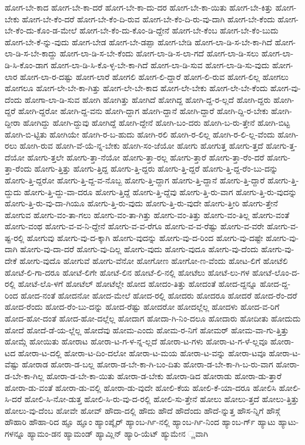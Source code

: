 {ಹೋಗ-ಬೇ-ಕಾದ
ಹೋಗ-ಬೇ-ಕಾ-ದರೆ
ಹೋಗ-ಬೇ-ಕಾ-ದು-ದರ
ಹೋಗ-ಬೇ-ಕಾ-ಯಿತು
ಹೋಗ-ಬೇ-ಕಿತ್ತು
ಹೋಗ-ಬೇಕು
ಹೋಗ-ಬೇ-ಕೆಂ-ದರೆ
ಹೋಗ-ಬೇ-ಕೆಂ-ದಿ-ರುವ
ಹೋಗ-ಬೇ-ಕೆಂ-ದಿ-ರು-ವು-ದಾಗಿ
ಹೋಗ-ಬೇ-ಕೆಂದು
ಹೋಗ-ಬೇ-ಕೆಂ-ದು-ಕೊಂ-ಡ-ಮೇಲೆ
ಹೋಗ-ಬೇ-ಕೆಂ-ದು-ಕೊಂ-ಡಿ-ದ್ದೇನೆ
ಹೋಗ-ಬೇ-ಕೆಂಬ
ಹೋಗ-ಬೇ-ಕೆಂ-ಬುದು
ಹೋಗ-ಬೇ-ಕೆ-ನ್ನು-ವುದು
ಹೋಗ-ಬೇಡ
ಹೋಗ-ಬೇ-ಡಪ್ಪಾ
ಹೋಗ-ಬೇಡಿ
ಹೋಗ-ಲಾ-ಡಿ-ಸ-ಬೇ-ಕಾ-ಗಿದೆ
ಹೋಗ-ಲಾ-ಡಿ-ಸ-ಬೇ-ಕಾದ್ದು
ಹೋಗ-ಲಾ-ಡಿ-ಸ-ಬೇ-ಕೆಂದು
ಹೋಗ-ಲಾ-ಡಿ-ಸ-ಲಾ-ಗದೆ
ಹೋಗ-ಲಾ-ಡಿ-ಸಲು
ಹೋಗ-ಲಾ-ಡಿ-ಸಿ-ಕೊಂ-ಡಾಗ
ಹೋಗ-ಲಾ-ಡಿ-ಸಿ-ಕೊ-ಳ್ಳ-ಬೇ-ಕಾ-ಗಿದೆ
ಹೋಗ-ಲಾ-ಡಿ-ಸುವ
ಹೋಗ-ಲಾ-ಡಿ-ಸು-ವುದು
ಹೋಗ-ಲಾರ
ಹೋಗ-ಲಾ-ರ-ದಷ್ಟು
ಹೋಗ-ಲಾರೆ
ಹೋಗಲಿ
ಹೋಗ-ಲಿ-ದ್ದಾರೆ
ಹೋಗ-ಲಿ-ರುವ
ಹೋಗ-ಲಿಲ್ಲ
ಹೋಗಲು
ಹೋಗಲೂ
ಹೋಗ-ಲೇ-ಬೇ-ಕಾ-ಗಿತ್ತು
ಹೋಗ-ಲೇ-ಬೇ-ಕಾದ
ಹೋಗ-ಲೇ-ಬೇಕು
ಹೋಗ-ಲೇ-ಬೇ-ಕೆಂದು
ಹೋಗ-ವು-ದೆಂದು
ಹೋಗಾ-ಲಾ-ಡಿ-ಸುವ
ಹೋಗಿ
ಹೋಗಿತ್ತು
ಹೋಗಿದೆ
ಹೋಗಿದ್ದ
ಹೋಗಿ-ದ್ದ-ರ-ಲ್ಲದೆ
ಹೋಗಿ-ದ್ದರು
ಹೋಗಿ-ದ್ದರೆ
ಹೋಗಿ-ದ್ದರೋ
ಹೋಗಿ-ದ್ದ-ವನು
ಹೋಗಿ-ದ್ದಾಗ
ಹೋಗಿ-ದ್ದಾನೆ
ಹೋಗಿ-ದ್ದಾರೆ
ಹೋಗಿ-ದ್ದಿ-ರ-ಬೇಕು
ಹೋಗಿ-ದ್ದೀರಾ
ಹೋಗಿದ್ದು
ಹೋಗಿ-ದ್ದುವು
ಹೋಗಿದ್ದೆ
ಹೋಗಿ-ದ್ದೇನೆ
ಹೋಗಿ-ಬಂ-ದರು
ಹೋಗಿ-ಬ-ರು-ತ್ತೇನೆ
ಹೋಗಿ-ಬಿಟ್ಟ
ಹೋಗಿ-ಬಿ-ಟ್ಟಿತು
ಹೋಗಿಯೇ
ಹೋಗಿ-ರ-ಬ-ಹುದು
ಹೋಗಿ-ರಲಿ
ಹೋಗಿ-ರ-ಲಿಲ್ಲ
ಹೋಗಿ-ರ-ಲಿ-ಲ್ಲ-ವೆಂದು
ಹೋಗಿ-ರಲು
ಹೋಗಿ-ರುವ
ಹೋಗಿ-ವೆ-ಯೆ-ನ್ನ-ಬೇಕು
ಹೋಗಿ-ಸಂ-ಜೆಯೋ
ಹೋಗು
ಹೋಗುತ್ತ
ಹೋಗು-ತ್ತದೆ
ಹೋಗು-ತ್ತ-ದೆಯೋ
ಹೋಗು-ತ್ತಲೇ
ಹೋಗು-ತ್ತಾ-ನೆಯೋ
ಹೋಗು-ತ್ತಾ-ರಲ್ಲ
ಹೋಗು-ತ್ತಾರೆ
ಹೋಗು-ತ್ತಾ-ರೆಂ-ದರೆ
ಹೋಗು-ತ್ತಾ-ರೆಂದು
ಹೋಗು-ತ್ತಿತ್ತು
ಹೋಗು-ತ್ತಿದ್ದ
ಹೋಗು-ತ್ತಿ-ದ್ದರು
ಹೋಗು-ತ್ತಿ-ದ್ದರೆ
ಹೋಗು-ತ್ತಿ-ದ್ದ-ರೆಂ-ಬು-ದನ್ನು
ಹೋಗು-ತ್ತಿ-ದ್ದರೋ
ಹೋಗು-ತ್ತಿ-ದ್ದ-ವ-ನೊಬ್ಬ
ಹೋಗು-ತ್ತಿ-ದ್ದಾಗ
ಹೋಗು-ತ್ತಿ-ದ್ದಾನೆ
ಹೋಗು-ತ್ತಿ-ದ್ದಾರೆ
ಹೋಗು-ತ್ತಿ-ದ್ದುದು
ಹೋಗು-ತ್ತಿ-ದ್ದು-ವಾ-ದರೂ
ಹೋಗು-ತ್ತಿದ್ದೆ
ಹೋಗು-ತ್ತಿ-ದ್ದೆವು
ಹೋಗು-ತ್ತಿ-ರು-ವಾಗ
ಹೋಗು-ತ್ತಿ-ರು-ವುದನ್ನು
ಹೋಗು-ತ್ತಿ-ರು-ವು-ದಾ-ಗಿಯೂ
ಹೋಗು-ತ್ತಿ-ರು-ವುದು
ಹೋಗು-ತ್ತಿ-ರು-ವುದೇ
ಹೋಗು-ತ್ತೀರಿ
ಹೋಗು-ತ್ತೇನೆ
ಹೋಗುವ
ಹೋಗು-ವಂ-ತಾ-ಗಲು
ಹೋಗು-ವಂ-ತಾ-ಗಿತ್ತು
ಹೋಗು-ವಂ-ತಿತ್ತು
ಹೋಗು-ವಂ-ತಿಲ್ಲ
ಹೋಗು-ವಂತೆ
ಹೋಗು-ವಂಥ
ಹೋಗು-ವ-ವ-ನಿ-ದ್ದೇನೆ
ಹೋಗು-ವ-ವ-ರೆಗೂ
ಹೋಗು-ವ-ವ-ರೆಷ್ಟು
ಹೋಗು-ವ-ವರೇ
ಹೋಗು-ವ-ಷ್ಟ-ರಲ್ಲಿ
ಹೋಗುವು
ಹೋಗು-ವು-ದ-ಕ್ಕಾಗಿ
ಹೋಗು-ವುದನ್ನು
ಹೋಗು-ವು-ದ-ರಿಂದ
ಹೋಗು-ವು-ದಷ್ಟೇ
ಹೋಗು-ವು-ದಾಗಿ
ಹೋಗು-ವು-ದಾ-ದರೆ
ಹೋಗು-ವು-ದಿಲ್ಲ
ಹೋಗು-ವುದು
ಹೋಗು-ವುದೂ
ಹೋಗು-ವು-ದೆಂದು
ಹೋಗು-ವು-ದೇಕೆ
ಹೋಗು-ವುದೊ
ಹೋಗುವೆ
ಹೋಗು-ವೆನೋ
ಹೋಗೋಣ
ಹೋಗೋ-ಣ-ವೆಂದು
ಹೋಟ-ಲಿಗೆ
ಹೋಟೆಲಿ
ಹೋಟೆ-ಲಿ-ಗಾ-ದರೂ
ಹೋಟೆ-ಲಿಗೇ
ಹೋಟೆ-ಲಿನ
ಹೋಟೆ-ಲಿ-ನಲ್ಲಿ
ಹೋಟೆಲು
ಹೋಟೆ-ಲು-ಗಳ
ಹೋಟೆ-ಲೊಂ-ದ-ರಲ್ಲಿ
ಹೋಟೆ-ಲೊ-ಳಗೆ
ಹೋಟೆಲ್
ಹೋಟೆಲ್ಲೇ
ಹೋದ
ಹೋದಂ-ತಿತ್ತು
ಹೋದಂತೆ
ಹೋದ-ದ್ದನ್ನೂ
ಹೋದ-ದ್ದ-ರಿಂದ
ಹೋದ-ನಂತೆ
ಹೋದನೋ
ಹೋದ-ಮೇಲೆ
ಹೋದ-ರಲ್ಲಿ
ಹೋದರು
ಹೋದರೂ
ಹೋದರೆ
ಹೋದ-ರೆಂ-ದರೆ
ಹೋದ-ರೆಂದು
ಹೋದ-ರೆಂ-ಬು-ದನ್ನು
ಹೋದ-ರೆಷ್ಟು
ಹೋದರೋ
ಹೋದಲ್ಲೆಲ್ಲ
ಹೋದಳು
ಹೋದ-ವ-ರಿಗೆ
ಹೋದ-ಹೋ-ದಂತೆ
ಹೋದ-ಹೋ-ದಲ್ಲೆಲ್ಲ
ಹೋದಾಗ
ಹೋದಾ-ಗಿ-ನಿಂ-ದಲೂ
ಹೋದಾರು
ಹೋದೀತು
ಹೋದುದು
ಹೋದೆ
ಹೋದೆ-ಡೆ-ಯ-ಲ್ಲೆಲ್ಲ
ಹೋದೆವು
ಹೋಮ-ಎಂದು
ಹೋಮ-ರ-ನಿಗೆ
ಹೋಮರ್
ಹೋಮ-ವಾ-ಗು-ತ್ತಿತ್ತು
ಹೋಮ್ಗೆ
ಹೋಯಿತು
ಹೋರಾಟ
ಹೋರಾ-ಟ-ಗ-ಳ-ನ್ನ-ಲ್ಲದೆ
ಹೋರಾ-ಟ-ಗಳು
ಹೋರಾ-ಟ-ಗ-ಳೆ-ಲ್ಲವೂ
ಹೋರಾ-ಟದ
ಹೋರಾ-ಟ-ದಲ್ಲಿ
ಹೋರಾ-ಟ-ದಿಂ-ದಲೋ
ಹೋರಾ-ಟ-ಮಯ
ಹೋರಾ-ಟ-ವನ್ನು
ಹೋರಾ-ಟವೂ
ಹೋರಾ-ಟ-ವೆಷ್ಟು
ಹೋರಾಡ
ಹೋರಾ-ಡ-ಬಲ್ಲ
ಹೋರಾ-ಡ-ಬೇ-ಕಾ-ಗಿ-ಬಂ-ದಿತು
ಹೋರಾ-ಡ-ಬೇ-ಕಾ-ಗಿ-ಬ-ರು-ವಾಗ
ಹೋರಾ-ಡ-ಬೇ-ಕಾ-ಗಿಲ್ಲ
ಹೋರಾ-ಡ-ಬೇ-ಕಾ-ಯಿತು
ಹೋರಾ-ಡ-ಬೇಕು
ಹೋರಾ-ಡಿದ
ಹೋರಾಡು
ಹೋರಾ-ಡು-ತ್ತಾರೆ
ಹೋರಾ-ಡು-ವಂತೆ
ಹೋರಾ-ಡು-ವಲ್ಲಿ
ಹೋರಾ-ಡು-ವುದೇ
ಹೋಲಿ-ಕೆಯ
ಹೋಲಿ-ಕೆ-ಯಾ-ದರೂ
ಹೋಲಿಸಿ
ಹೋಲಿ-ಸಿ-ದರೆ
ಹೋಲಿ-ಸಿ-ನೋ-ಡುತ್ತ
ಹೋಲಿ-ಸಿ-ರು-ವು-ದ-ರಲ್ಲಿ
ಹೋಲಿ-ಸು-ತ್ತೇನೆ
ಹೋಲು
ಹೋಲು-ತ್ತದೆ
ಹೋಲು-ತ್ತಿತ್ತು
ಹೋಲು-ವು-ದೆಂಬ
ಹೋವೇ
ಹೋವ್
ಹೌದಾ-ದಲ್ಲಿ
ಹೌದು
ಹೌದೆ
ಹೌದೆಂದು
ಹೌದೆ-ನ್ನುತ್ತ
ಹೌಸ-ನ್ನಿಗೆ
ಹೌಸ್ಗೆ
ಹೌಹಾರಿ
ಹೌಹಾ-ರಿದ
ಹ್ಞೂ
ಹ್ಞೂಂ
ಹ್ಯಾಂಪ್ಶೈರ್
ಹ್ಯಾಂಬ-ರ್ಗಿ-ನಲ್ಲಿ
ಹ್ಯಾಂಬ-ರ್ಗಿ-ನಿಂದ
ಹ್ಯಾಂಬ-ರ್ಗ್
ಹ್ಯಾಟು
ಹ್ಯಾಟು-ಗಳನ್ನೂ
ಹ್ಯಾಮಂ-ಡನ
ಹ್ಯಾಮಂಡ್
ಹ್ಯಾಮ್ಲಿನ್
ಹ್ಯಾರಿ-ಯೆಟ್
ಹ್ಯುಮೇನ
್ಣವಾಗಿ
}
